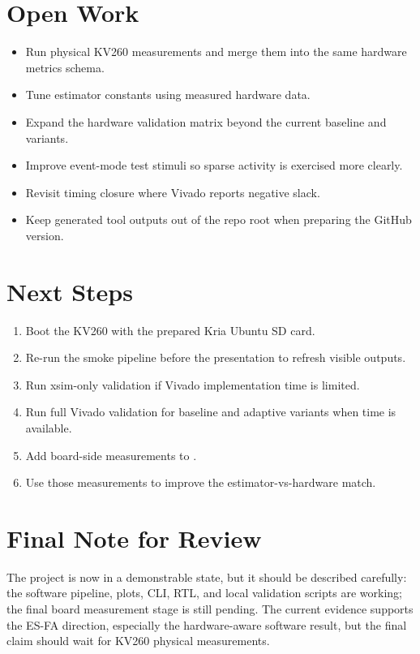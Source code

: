 \documentclass[11pt]{article}
\begin{document}
\section{Open Work}
\begin{itemize}[leftmargin=*]
\item Run physical KV260 measurements and merge them into the same hardware
metrics schema.
\item Tune estimator constants using measured hardware data.
\item Expand the hardware validation matrix beyond the current baseline and
 variants.
\item Improve event-mode test stimuli so sparse activity is exercised more
clearly.
\item Revisit timing closure where Vivado reports negative slack.
\item Keep generated tool outputs out of the repo root when preparing the GitHub
version.
\end{itemize}

\section{Next Steps}
\begin{enumerate}[leftmargin=*]
\item Boot the KV260 with the prepared Kria Ubuntu SD card.
\item Re-run the smoke pipeline before the presentation to refresh visible
outputs.
\item Run xsim-only validation if Vivado implementation time is limited.
\item Run full Vivado validation for baseline and adaptive variants when time is
available.
\item Add board-side measurements to .
\item Use those measurements to improve the estimator-vs-hardware match.
\end{enumerate}

\section{Final Note for Review}
The project is now in a demonstrable state, but it should be described carefully:
the software pipeline, plots, CLI, RTL, and local validation scripts are working;
the final board measurement stage is still pending. The current evidence supports
the ES-FA direction, especially the hardware-aware software result, but the final
claim should wait for KV260 physical measurements.
\end{document}
